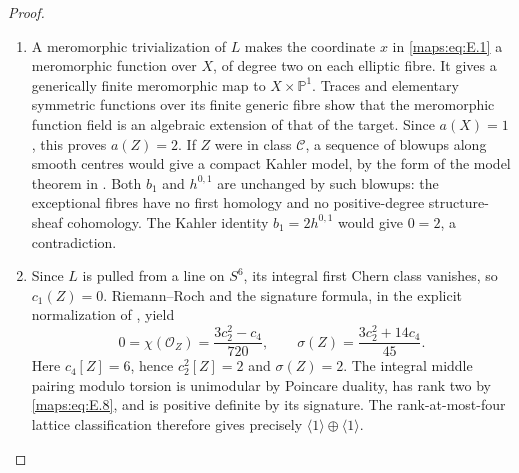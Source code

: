 \begin{proof}
\begin{enumerate}[label=\arabic*.,leftmargin=*]
\item A meromorphic trivialization of $L$ makes the coordinate $x$ in
\eqref{maps:eq:E.1} a meromorphic function over $X$, of degree two on each
elliptic fibre.  It gives a generically finite meromorphic map to
$X\times\mathbb P^1$.  Traces and elementary symmetric functions
over its finite generic fibre show that the meromorphic function
field is an algebraic extension of that of the target.  Since
$a(X)=1$, this proves $a(Z)=2$.  If $Z$ were in class
$\mathcal C$, a sequence of blowups along smooth centres would
give a compact Kahler model, by the form of the model theorem
in \cite[Theorem 1.1 and Remark 1.2]{ffJiaMeng}.
Both $b_1$ and $h^{0,1}$ are unchanged by such blowups: the
exceptional fibres have no first homology and no positive-degree
structure-sheaf cohomology.  The Kahler identity
$b_1=2h^{0,1}$ would give $0=2$, a contradiction.

\item Since $L$ is pulled from a line on $S^6$, its integral first Chern
class vanishes, so $c_1(Z)=0$.  Riemann--Roch and the signature
formula, in the explicit normalization of
\cite[(1.2)--(1.4)]{ffEsoleKang}, yield
\[
 0=\chi(\mathcal O_Z)=\frac{3c_2^2-c_4}{720},\qquad
 \sigma(Z)=\frac{3c_2^2+14c_4}{45}.
\]
Here $c_4[Z]=6$, hence $c_2^2[Z]=2$ and $\sigma(Z)=2$.
The integral middle pairing modulo torsion is unimodular by
Poincare duality, has rank two by \eqref{maps:eq:E.8}, and is positive definite
by its signature.  The rank-at-most-four lattice classification
\cite[Theorem 2.2.1]{ffPetersSterk} therefore gives precisely
$\langle1\rangle\oplus\langle1\rangle$.
\end{enumerate}
\end{proof}

